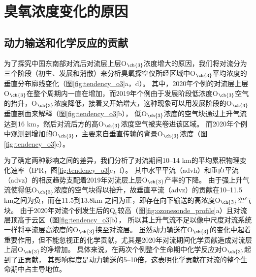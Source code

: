 \section{臭氧浓度变化的原因}

\subsection{动力输送和化学反应的贡献} \label{sec:convec_impacts}

为了探究中国东南部对流后对流层上层O$_{\ch{3}}$浓度增大的原因，我们将对流分为三个阶段（初生、发展和消散）来分析臭氧探空仪所经区域中O$_{\ch{3}}$平均浓度的垂直分布廓线变化（图\ref{fig:tendency_o3}a，d）。
其中，2020年个例的对流层上层O$_{\ch{3}}$在整个周期内一直在增加，而2019年个例由于发展阶段低浓度O$_{\ch{3}}$空气的抬升，O$_{\ch{3}}$浓度降低，接着又开始增大，这种现象可以用发展阶段的O$_{\ch{3}}$垂直剖面来解释（图\ref{fig:tendency_o3}b），
低O$_{\ch{3}}$浓度的空气块通过上升气流达到16 km，然后对流后方的高O$_{\ch{3}}$浓度空气被夹卷进该区域。
而2020年个例中观测到增加的O$_{\ch{3}}$，主要来自垂直传输的背景O$_{\ch{3}}$浓度（图\ref{fig:tendency_o3}e）。

为了确定两种影响之间的差异，我们分析了对流期间10--14 km的平均累积物理变化速率（IPR，图\ref{fig:tendency_o3}c，f）。
其中水平平流（advh）和垂直平流（advz）的相反趋势支配着2019年对流层上层O$_{\ch{3}}$产率的下降。
由于强上升气流使得低O$_{\ch{3}}$浓度的空气块得以抬升，故垂直平流（advz）的贡献在10--11.5 km之间为负，而在11.5到13.8km 之间为正，即存在向下输送的高浓度O$_{\ch{3}}$空气块。
由于2020年对流个例发生后的Q$_v$较高（图\ref{fig:ozonesonde_profile}a）且对流层顶高于云区（图\ref{fig:tendency_o3}b），
所以其上升气流不足以像中尺度对流系统一样将平流层高浓度的O$_{\ch{3}}$挟至对流层\citep{Phoenix.2020}。
虽然动力输送在O$_{\ch{3}}$的变化中起着重要作用，但不能忽视正的化学贡献，尤其是2020年对流期间化学贡献造成对流层上层O$_{\ch{3}}$的净增加。
具体来说，在两次个例整个生命期中化学反应对O$_{\ch{3}}$起到了正贡献，
其影响程度是动力输送的5--10倍，这表明化学贡献在对流的整个生命期中占主导地位。


